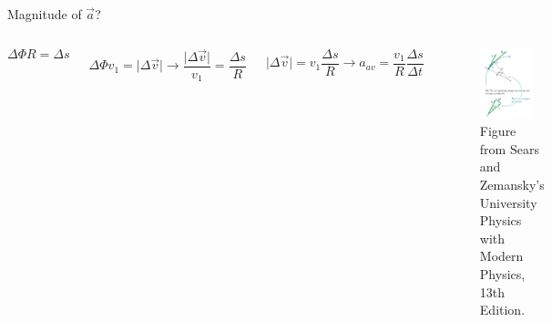 \documentclass[]{beamer}
\begin{document}




\begin{frame}

    Magnitude of $\vec{a}$?
   
    \begin{columns}[c]
         \column{2.3in}  %
      
         
        

         \begin{equation*}
            \Delta \Phi R =\Delta s 
           \end{equation*}
           
         
            \begin{equation*}
            \Delta \Phi v_1 =\vert \Delta  \vec{v} \vert \rightarrow \frac{\vert\Delta \vec{v}\vert}{v_1} =\frac{\Delta s}{R}
           \end{equation*}
  
         \begin{equation*}
          \vert\Delta \vec{v}\vert =v_1\frac{\Delta s}{R}\rightarrow a_{av}=\frac{v_1}{R}\frac{\Delta s}{\Delta t}
           \end{equation*}
           
     
           
 
         \column{2.5in}
         
   
         \begin{figure}[h!]  
             \includegraphics[width=0.8\textwidth]{images/27.jpg}
             \caption{ {\tiny Figure from Sears and Zemansky's University Physics 
             with Modern Physics, 13th Edition.} }
           \end{figure}
           

\end{columns}
\end{frame}
\end{document}

